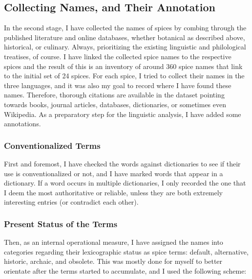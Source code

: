 
\subsection{Collecting Names, and Their Annotation}
\label{sec:collecting_names}

In the second stage, I have collected the names of spices by combing through the published literature and online databases, whether botanical as described above, historical, or culinary. Always, prioritizing the existing linguistic and philological treatises, of course. I have linked the collected spice names to the respective spices and the result of this is an inventory of around 360 spice names that link to the initial set of 24 spices. For each spice, I tried to collect their names in the three languages, and it was also my goal to record where I have found these names. Therefore, thorough citations are available in the dataset pointing towards books, journal articles, databases, dictionaries, or sometimes even Wikipedia. As a preparatory step for the linguistic analysis, I have added some annotations. 

\subsubsection{Conventionalized Terms}

First and foremost, I have checked the words against dictionaries to see if their use is conventionalized or not, and I have marked words that appear in a dictionary. If a word occurs in multiple dictionaries, I only recorded the one that I deem the most authoritative or reliable, unless they are both extremely interesting entries (or contradict each other).

\subsubsection{Present Status of the Terms}

Then, as an internal operational measure, I have assigned the names into categories regarding their lexicographic status as spice terms: default, alternative, historic, archaic, and obsolete. This was mostly done for myself to better orientate after the terms started to accumulate, and I used the following scheme: 

